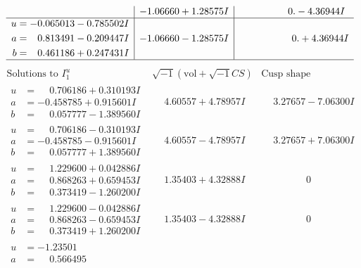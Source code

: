 \documentclass[1p]{elsarticle_modified}
\theoremstyle{definition}
\newcommand{\I}{\sqrt{-1}}
\begin{document}
$$\begin{array}{c|c|c}
 & -1.06660 + 1.28575 I & \phantom{-0.000000 } 0. - 4.36944 I \\ \hline\begin{aligned}
u &= -0.065013 - 0.785502 I \\
a &= \phantom{-}0.813491 - 0.209447 I \\
b &= \phantom{-}0.461186 + 0.247431 I\end{aligned}
 & -1.06660 - 1.28575 I & \phantom{-0.000000 -}0. + 4.36944 I\\
 \hline 
 \end{array}$$\newpage$$\begin{array}{c|c|c}  
\text{Solutions to }I^u_{1}& \I (\text{vol} + \sqrt{-1}CS) & \text{Cusp shape}\\
 \hline 
\begin{aligned}
u &= \phantom{-}0.706186 + 0.310193 I \\
a &= -0.458785 + 0.915601 I \\
b &= \phantom{-}0.057777 - 1.389560 I\end{aligned}
 & \phantom{-}4.60557 + 4.78957 I & \phantom{-}3.27657 - 7.06300 I \\ \hline\begin{aligned}
u &= \phantom{-}0.706186 - 0.310193 I \\
a &= -0.458785 - 0.915601 I \\
b &= \phantom{-}0.057777 + 1.389560 I\end{aligned}
 & \phantom{-}4.60557 - 4.78957 I & \phantom{-}3.27657 + 7.06300 I \\ \hline\begin{aligned}
u &= \phantom{-}1.229600 + 0.042886 I \\
a &= \phantom{-}0.868263 + 0.659453 I \\
b &= \phantom{-}0.373419 - 1.260200 I\end{aligned}
 & \phantom{-}1.35403 + 4.32888 I & \phantom{-0.000000 } 0 \\ \hline\begin{aligned}
u &= \phantom{-}1.229600 - 0.042886 I \\
a &= \phantom{-}0.868263 - 0.659453 I \\
b &= \phantom{-}0.373419 + 1.260200 I\end{aligned}
 & \phantom{-}1.35403 - 4.32888 I & \phantom{-0.000000 } 0 \\ \hline\begin{aligned}
u &= -1.23501\phantom{ +0.000000I} \\
a &= \phantom{-}0.566495\phantom{ +0.000000I} \\

\end{aligned}
\end{array}$$
\end{document}
